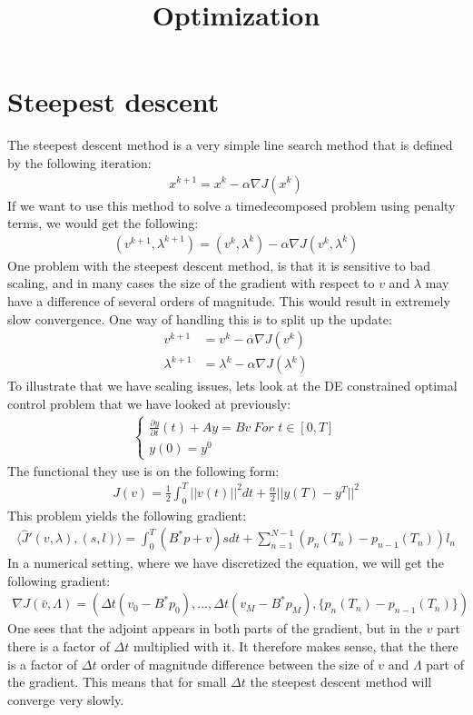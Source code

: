 \documentclass[11pt,a4paper]{article}
\title{Optimization}
\begin{document}
\section{Steepest descent}
The steepest descent method is a very simple line search method that is defined by the following iteration:
\begin{align*}
x^{k+1} = x^k - \alpha\nabla J(x^k)
\end{align*}
If we want to use this method to solve a timedecomposed problem using penalty terms, we would get the following:
\begin{align*}
(v^{k+1},\lambda^{k+1})= (v^k,\lambda^k)-\alpha\nabla J(v^k,\lambda^k)
\end{align*}
One problem with the steepest descent method, is that it is sensitive to bad scaling, and in many cases the size of the gradient with respect to $v$ and $\lambda$ may have a difference of several orders of magnitude. This would result in extremely slow convergence. One way of handling this is to split up the update:
\begin{align*}
v^{k+1} &= v^k - \alpha\nabla J(v^k)\\
\lambda^{k+1} &= \lambda^k - \alpha\nabla J(\lambda^k)
\end{align*}
To illustrate that we have scaling issues, lets look at the DE constrained optimal control problem that we have looked at previously:
\begin{align}
	\left\{
     \begin{array}{lr}
		\frac{\partial y}{\partial t}(t)+Ay=Bv  \ \textit{For $t \in [0,T]$}\\
		y(0)=y^0
	\end{array}
	\right. \label{OC_PDE}
\end{align}
The functional they use is on the following form:
\begin{align}
J(v) = \frac{1}{2}\int_0^T ||v(t)||^2 dt + \frac{\alpha}{2}||y(T)-y^T||^2
\end{align}
This problem yields the following gradient:
\begin{align}
\langle\hat{J}'(v,\lambda),(s,l) \rangle = \int_0^T (B^*p+v)sdt + \sum_{n=1}^{N-1}(p_n(T_n) - p_{n-1}(T_n))l_n \label{penalty grad}
\end{align}
In a numerical setting, where we have discretized the equation, we will get the following gradient:
\begin{align*}
\nabla J(\bar{v},\Lambda) = (\Delta t (v_0-B^*p_0),...,\Delta t (v_{M}-B^*p_M),\{p_n(T_n) - p_{n-1}(T_n)\})
\end{align*}
One sees that the adjoint appears in both parts of the gradient, but in the $v$ part there is a factor of $\Delta t$ multiplied with it. It therefore makes sense, that the there is a factor of $\Delta t$ order of magnitude difference between the size of $v$ and $\Lambda$ part of the gradient. This means that for small $\Delta t$ the steepest descent method will converge very slowly.
\end{document}
